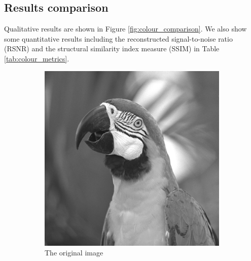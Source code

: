 \documentclass{article}
\begin{document}
\subsection*{Results comparison} \label{sec:results_colour}
Qualitative results are shown in Figure \ref{fig:colour_comparison}. We also show some quantitative results including the reconstructed signal-to-noise ratio (RSNR) and the structural similarity index measure (SSIM) in Table \ref{tab:colour_metrics}.

\begin{figure}[htbp]     
    \centering
    \begin{subfigure}[b]{0.24\textwidth}
        \centering
        \includegraphics[width=\textwidth]{images/gray.png}
        \caption{The original image}
        \label{fig:colour}
    \end{subfigure}
    \begin{subfigure}[b]{0.24\textwidth}
        \centering

\end{subfigure}
\end{figure}
\end{document}
